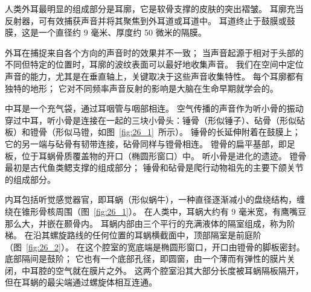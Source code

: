 人类外耳最明显的组成部分是耳廓，它是软骨支撑的皮肤的突出褶皱。
耳廓充当反射器，可有效捕获声音并将其聚焦到外耳道或耳道中。
耳道终止于鼓膜或鼓膜，这是一个直径约 9 毫米、厚度约 50 微米的隔膜。


外耳在捕捉来自各个方向的声音时的效果并不一致；
当声音起源于相对于头部的不同但特定的位置时，耳廓的波纹表面可以最好地收集声音。
我们在空间中定位声音的能力，尤其是在垂直轴上，关键取决于这些声音收集特性。
每个耳廓都有独特的地形；
它对不同频率声音反射的影响是大脑在生命早期就学会的。


中耳是一个充气袋，通过耳咽管与咽部相连。
空气传播的声音作为听小骨的振动穿过中耳，听小骨是连接在一起的三块小骨头：锤骨（形似锤子）、砧骨（形似砧板）和镫骨（形似马镫，如图~\ref{fig:26_1}~所示）。
锤骨的长延伸附着在鼓膜上；
它的另一端与砧骨有韧带连接，砧骨同样与镫骨相连。
镫骨的扁平基部，即足板，位于耳蜗骨质覆盖物的开口（椭圆形窗口）中。
听小骨是进化的遗迹。
镫骨最初是古代鱼类鳃支撑的组成部分；
锤骨和砧骨是爬行动物祖先的主要下颌关节的组成部分。


内耳包括听觉感觉器官，即耳蜗（形似蜗牛），一种直径逐渐减小的盘绕结构，缠绕在锥形骨核周围（图~\ref{fig:26_1}）。
在人类中，耳蜗大约有 9 毫米宽，有鹰嘴豆那么大，并嵌在颞骨内。
耳蜗内部由三个平行的充满液体的隔室组成，称为阶梯。
在沿其螺旋路线的任何位置的耳蜗横截面中，顶部隔室是前庭阶（图~\ref{fig:26_2}）。
在这个腔室的宽底端是椭圆形窗口，开口由镫骨的脚板密封。
底部隔间是鼓阶；
它也有一个底部孔径，即圆窗，由一个薄而有弹性的膜片关闭，中耳腔的空气就在膜片之外。
这两个腔室沿其大部分长度被耳蜗隔板隔开，但在耳蜗的最尖端通过螺旋体相互连通。


